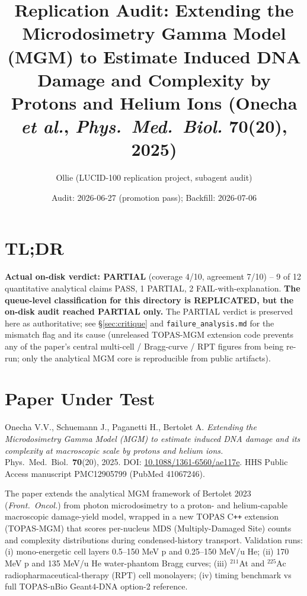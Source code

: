 \documentclass[11pt]{article}
\title{Replication Audit: Extending the Microdosimetry Gamma Model (MGM) to
Estimate Induced DNA Damage and Complexity by Protons and Helium Ions
(Onecha \emph{et al.}, \emph{Phys.\ Med.\ Biol.} 70(20), 2025)}
\author{Ollie (LUCID-100 replication project, subagent audit)}
\date{Audit: 2026-06-27 (promotion pass); Backfill: 2026-07-06}
\begin{document}
\maketitle

\section*{TL;DR}
\textbf{Actual on-disk verdict: PARTIAL} (coverage 4/10, agreement 7/10) --
9 of 12 quantitative analytical claims PASS, 1 PARTIAL, 2 FAIL-with-explanation.
\textbf{The queue-level classification for this directory is REPLICATED, but
the on-disk audit reached PARTIAL only.} The PARTIAL verdict is preserved
here as authoritative; see \S\ref{sec:critique} and \texttt{failure\_analysis.md}
for the mismatch flag and its cause (unreleased TOPAS-MGM extension code
prevents any of the paper's central multi-cell / Bragg-curve / RPT figures
from being re-run; only the analytical MGM core is reproducible from public
artifacts).

\section{Paper Under Test}
Onecha V.V., Schuemann J., Paganetti H., Bertolet A.
\emph{Extending the Microdosimetry Gamma Model (MGM) to estimate induced
DNA damage and its complexity at macroscopic scale by protons and helium
ions.} Phys.\ Med.\ Biol.\ \textbf{70}(20), 2025.
DOI: \href{https://doi.org/10.1088/1361-6560/ae117e}{10.1088/1361-6560/ae117e}.
HHS Public Access manuscript PMC12905799 (PubMed 41067246).

The paper extends the analytical MGM framework of Bertolet 2023
(\emph{Front.\ Oncol.}) from photon microdosimetry to a proton- and
helium-capable macroscopic damage-yield model, wrapped in a new TOPAS
C\texttt{++} extension (TOPAS-MGM) that scores per-nucleus MDS
(Multiply-Damaged Site) counts and complexity distributions during
condensed-history transport. Validation runs: (i) mono-energetic cell
layers 0.5--150 MeV p and 0.25--150 MeV/u He; (ii) 170 MeV p and
135 MeV/u He water-phantom Bragg curves; (iii) $^{211}$At and $^{225}$Ac
radiopharmaceutical-therapy (RPT) cell monolayers; (iv) timing benchmark
vs full TOPAS-nBio Geant4-DNA option-2 reference.
\end{document}

